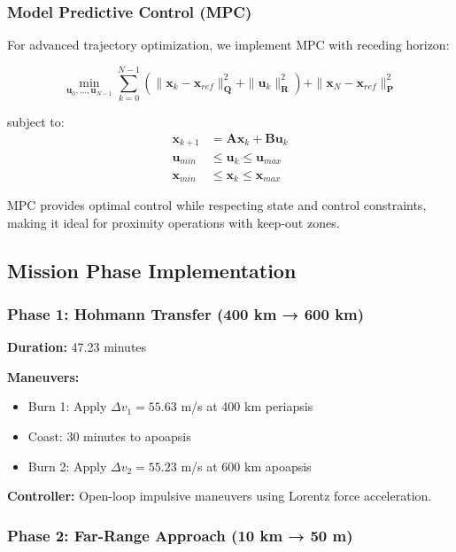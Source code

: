 \documentclass[12pt,a4paper]{article}
\begin{document}
\subsubsection{Model Predictive Control (MPC)}

For advanced trajectory optimization, we implement MPC with receding horizon:

\begin{equation}
\min_{\mathbf{u}_0, \ldots, \mathbf{u}_{N-1}} \sum_{k=0}^{N-1} \left(\|\mathbf{x}_k - \mathbf{x}_{ref}\|_{\mathbf{Q}}^2 + \|\mathbf{u}_k\|_{\mathbf{R}}^2\right) + \|\mathbf{x}_N - \mathbf{x}_{ref}\|_{\mathbf{P}}^2
\label{eq:mpc_cost}
\end{equation}

subject to:
\begin{align}
\mathbf{x}_{k+1} &= \mathbf{A}\mathbf{x}_k + \mathbf{B}\mathbf{u}_k \\
\mathbf{u}_{min} &\leq \mathbf{u}_k \leq \mathbf{u}_{max} \\
\mathbf{x}_{min} &\leq \mathbf{x}_k \leq \mathbf{x}_{max}
\label{eq:mpc_constraints}
\end{align}

MPC provides optimal control while respecting state and control constraints, making it ideal for proximity operations with keep-out zones.

\subsection{Mission Phase Implementation}

\subsubsection{Phase 1: Hohmann Transfer (400 km → 600 km)}

\textbf{Duration:} 47.23 minutes

\textbf{Maneuvers:}
\begin{itemize}
\item Burn 1: Apply $\Delta v_1 = 55.63$ m/s at 400 km periapsis
\item Coast: 30 minutes to apoapsis
\item Burn 2: Apply $\Delta v_2 = 55.23$ m/s at 600 km apoapsis
\end{itemize}

\textbf{Controller:} Open-loop impulsive maneuvers using Lorentz force acceleration.

\subsubsection{Phase 2: Far-Range Approach (10 km → 50 m)}
\end{document}

